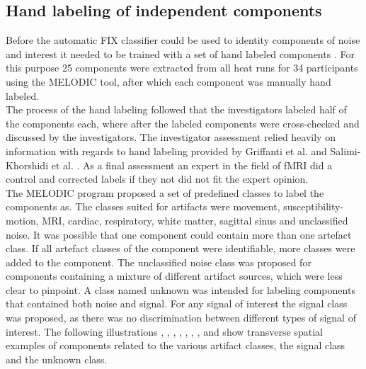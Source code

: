 \subsection{Hand labeling of independent components}
Before the automatic FIX classifier could be used to identity components of noise and interest it needed to be trained with a set of hand labeled components \cite{Salimi-Khorshidi2014}. For this purpose 25 components were extracted from all heat runs for 34 participants using the MELODIC tool, after which each component was manually hand labeled. \\
The process of the hand labeling followed that the investigators labeled half of the components each, where after the labeled components were cross-checked and discussed by the investigators. The investigator assessment relied heavily on information with regards to hand labeling provided by Griffanti et al. \cite{Griffanti2017} and Salimi-Khorshidi et al. \cite{Salimi-Khorshidi2014}. As a final assessment an expert in the field of fMRI did a control and corrected labels if they not did not fit the expert opinion. \\
The MELODIC program proposed a set of predefined classes to label the components as. The classes suited for artifacts were movement, susceptibility-motion, MRI, cardiac, respiratory, white matter, sagittal sinus and unclassified noise. It was possible that one component could contain more than one artefact class. If all artefact classes of the component were identifiable, more classes were added to the component. The unclassified noise class was proposed for components containing a mixture of different artifact sources, which were less clear to pinpoint. A class named unknown was intended for labeling components that contained both noise and signal. For any signal of interest the signal class was proposed, as there was no discrimination between different types of signal of interest. 
The following illustrations , , , , , , ,  and  show transverse spatial examples of components related to the various artifact classes, the signal class and the unknown class.

